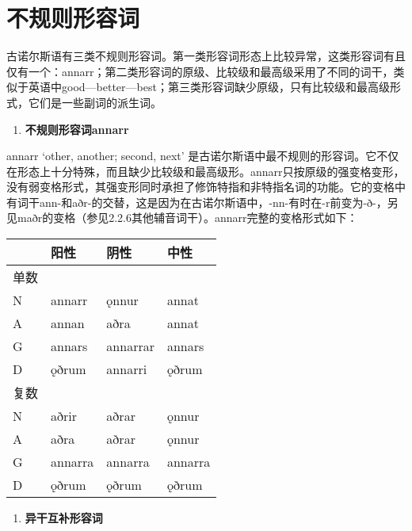\section{不规则形容词}\label{不规则形容词}

古诺尔斯语有三类不规则形容词。第一类形容词形态上比较异常，这类形容词有且仅有一个：annarr；第二类形容词的原级、比较级和最高级采用了不同的词干，类似于英语中good---better---best；第三类形容词缺少原级，只有比较级和最高级形式，它们是一些副词的派生词。

\begin{enumerate}
  \def\labelenumi{\arabic{enumi})}
  \item
        \textbf{不规则形容词annarr}
\end{enumerate}

annarr `other, another; second, next‌'
是古诺尔斯语中最不规则的形容词。它不仅在形态上十分特殊，而且缺少比较级和最高级形。annarr只按原级的强变格变形，没有弱变格形式，其强变形同时承担了修饰特指和非特指名词的功能。它的变格中有词干ann-和aðr-的交替，这是因为在古诺尔斯语中，-nn-有时在-r前变为-ð-，另见maðr的变格（参见2.2.6其他辅音词干）。annarr完整的变格形式如下：

\begin{longtable}{llll}
  \toprule
       & 阳性    & 阴性     & 中性    \\
  \midrule
  \endhead
  \bottomrule
  \endfoot
  单数 &         &          &         \\
  N    & annarr  & ǫnnur    & annat   \\
  A    & annan   & aðra     & annat   \\
  G    & annars  & annarrar & annars  \\
  D    & ǫðrum   & annarri  & ǫðrum   \\
  复数 &         &          &         \\
  N    & aðrir   & aðrar    & ǫnnur   \\
  A    & aðra    & aðrar    & ǫnnur   \\
  G    & annarra & annarra  & annarra \\
  D    & ǫðrum   & ǫðrum    & ǫðrum   \\
\end{longtable}

\begin{enumerate}
  \def\labelenumi{\arabic{enumi})}
  \setcounter{enumi}{1}
  \item
        \textbf{异干互补形容词}
\end{enumerate}

